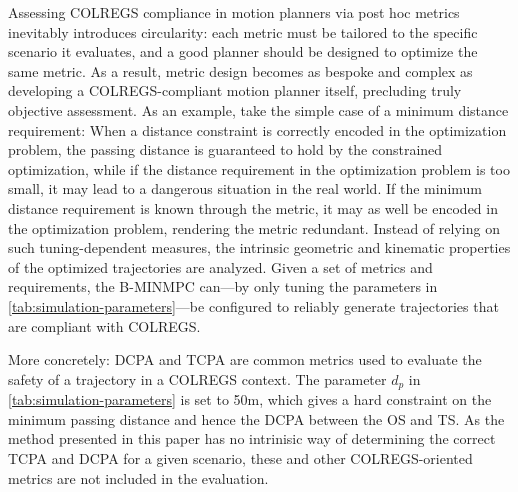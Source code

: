 Assessing COLREGS compliance in motion planners via post hoc metrics inevitably introduces circularity: each metric must be tailored to the specific scenario it evaluates, and a good planner should be designed to optimize the same metric. 
As a result, metric design becomes as bespoke and complex as developing a COLREGS-compliant motion planner itself, precluding truly objective assessment.  As an example, take the simple case of a minimum distance requirement: When a distance constraint is correctly encoded in the optimization problem, the passing distance is guaranteed to hold by the constrained optimization, while if the distance requirement in the optimization problem is too small, it may lead to a dangerous situation in the real world.  If the minimum distance requirement is known through the metric, it may as well be encoded in the optimization problem, rendering the metric redundant. 
Instead of relying on such tuning-dependent measures, the intrinsic geometric and kinematic properties of the optimized trajectories are analyzed.  Given a set of metrics and requirements, the B-MINMPC can---by only tuning the parameters in \cref{tab:simulation-parameters}---be configured to reliably generate trajectories that are compliant with COLREGS. 

More concretely: \acrfull{DCPA} and \acrfull{TCPA} are common metrics used to evaluate the safety of a trajectory in a COLREGS context. The parameter $d_p$ in \cref{tab:simulation-parameters} is set to 50m, which gives a hard constraint on the minimum passing distance and hence the \acrshort{DCPA} between the OS and TS. As the method presented in this paper has no intrinisic way of determining the correct \acrshort{TCPA} and \acrshort{DCPA} for a given scenario, these and other COLREGS-oriented metrics are not included in the evaluation. 


